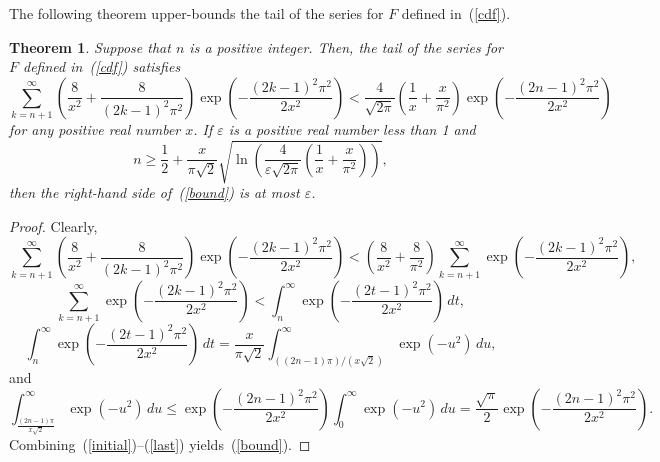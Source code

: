 \documentclass[12pt]{article}
\newtheorem{theorem}{Theorem}[]
\def\epsilon{\varepsilon}
\begin{document}
The following theorem upper-bounds the tail of the series
for $F$ defined in~(\ref{cdf}).
%
\begin{theorem}
\label{mainboundrange}
Suppose that $n$ is a positive integer.
Then, the tail of the series for $F$ defined in~(\ref{cdf}) satisfies
%
\begin{equation}
\label{bound}
\sum_{k=n+1}^\infty
\left( \frac{8}{x^2} + \frac{8}{(2k-1)^2 \pi^2} \right)
\exp\left(-\frac{(2k-1)^2 \pi^2}{2x^2}\right)
< \frac{4}{\sqrt{2\pi}} \left( \frac{1}{x} + \frac{x}{\pi^2} \right)
\exp\left( -\frac{(2n-1)^2 \pi^2}{2x^2} \right)
\end{equation}
%
for any positive real number $x$.
If $\epsilon$ is a positive real number less than 1 and
%
\begin{equation}
\label{kuterms}
n \ge \frac{1}{2} + \frac{x}{\pi\sqrt{2}}
\sqrt{\ln\left( \frac{4}{\epsilon \sqrt{2 \pi}}
\left( \frac{1}{x} + \frac{x}{\pi^2} \right) \right)},
\end{equation}
%
then the right-hand side of~(\ref{bound}) is at most $\epsilon$.
\end{theorem}

\begin{proof}
Clearly,
%
\begin{equation}
\label{initial}
\sum_{k=n+1}^\infty
\!\left( \frac{8}{x^2} + \frac{8}{(2k-1)^2 \pi^2} \right)
\exp\left(-\frac{(2k-1)^2 \pi^2}{2x^2}\right)
< \left( \frac{8}{x^2} + \frac{8}{\pi^2} \right) \sum_{k=n+1}^\infty
\!\exp\left(-\frac{(2k-1)^2 \pi^2}{2x^2}\right)\!,
\end{equation}
%
\begin{equation}
\sum_{k=n+1}^\infty \exp\left(-\frac{(2k-1)^2 \pi^2}{2x^2}\right)
< \int_n^\infty \exp\left(-\frac{(2t-1)^2 \pi^2}{2x^2}\right) \, dt,
\end{equation}
%
\begin{equation}
\int_n^\infty \exp\left(-\frac{(2t-1)^2 \pi^2}{2x^2}\right) \, dt
= \frac{x}{\pi \sqrt{2}}
\int_{((2n-1) \pi)/(x\sqrt{2})}^\infty \exp(-u^2) \, du,
\end{equation}
%
and
%
\begin{equation}
\label{last}
\int_{\frac{(2n-1) \pi}{x\sqrt{2}}}^\infty \exp(-u^2) \, du
\le \exp\left( -\frac{(2n-1)^2 \pi^2}{2x^2} \right)
\int_0^\infty \!\exp(-u^2) \, du
= \frac{\sqrt{\pi}}{2} \exp\left( -\frac{(2n-1)^2 \pi^2}{2x^2} \right)\!.
\end{equation}
%
Combining~(\ref{initial})--(\ref{last}) yields~(\ref{bound}).
\end{proof}
\end{document}

